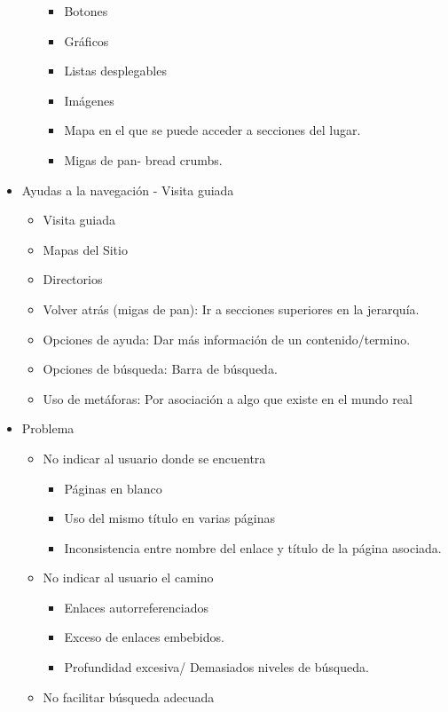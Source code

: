 \documentclass[12pt, twoside, openright]{report} %
\begin{document}
\begin{itemize}
\begin{itemize}
\begin{itemize}
            \item
              Botones
            \item
              Gráficos
            \item
              Listas desplegables
            \item
              Imágenes
            \item
              Mapa en el que se puede acceder a secciones del lugar.
            \item
              Migas de pan- bread crumbs.
          \end{itemize}
      \end{itemize}
      \pagebreak
    \item Ayudas a la navegación - Visita guiada
      \begin{itemize}
        \item Visita guiada
        \item Mapas del Sitio
        \item Directorios
        \item Volver atrás (migas de pan): Ir a secciones superiores en la jerarquía.
        \item Opciones de ayuda: Dar más información de un contenido/termino.
        \item Opciones de búsqueda: Barra de búsqueda.
        \item Uso de metáforas: Por asociación a algo que existe en el mundo real
      \end{itemize}
    \item Problema

    \begin{itemize}

      \item
      No indicar al usuario donde se encuentra

        \begin{itemize}
          \item Páginas en blanco
          \item
            Uso del mismo título en varias páginas 
          \item Inconsistencia entre
            nombre del enlace y título de la página asociada.
        \end{itemize}
      \item
      No indicar al usuario el camino 

        \begin{itemize}
          \item Enlaces autorreferenciados
          \item
            Exceso de enlaces embebidos. 
          \item Profundidad excesiva/ Demasiados
            niveles de búsqueda.
        \end{itemize}
      \item No facilitar búsqueda adecuada 


\end{itemize}
\end{itemize}
\end{document}
